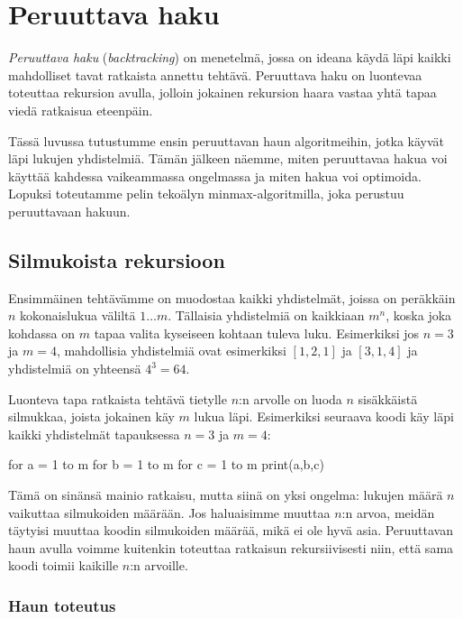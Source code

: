 \chapter{Peruuttava haku}

\emph{Peruuttava haku} (\emph{backtracking}) on menetelmä,
jossa on ideana käydä läpi kaikki mahdolliset tavat 
ratkaista annettu tehtävä.
Peruuttava haku on luontevaa toteuttaa rekursion avulla,
jolloin jokainen rekursion haara vastaa yhtä tapaa
viedä ratkaisua eteenpäin.

Tässä luvussa tutustumme ensin peruuttavan haun algoritmeihin,
jotka käyvät läpi lukujen yhdistelmiä.
Tämän jälkeen näemme, miten peruuttavaa hakua voi käyttää
kahdessa vaikeammassa ongelmassa ja miten hakua voi optimoida.
Lopuksi toteutamme pelin tekoälyn minmax-algoritmilla,
joka perustuu peruuttavaan hakuun.

\section{Silmukoista rekursioon}

Ensimmäinen tehtävämme on muodostaa kaikki yhdistelmät,
joissa on peräk\-käin $n$ kokonaislukua väliltä $1 \dots m$.
Tällaisia yhdistelmiä on kaikkiaan $m^n$,
koska joka kohdassa on $m$ tapaa valita kyseiseen kohtaan tuleva luku.
Esimerkiksi jos $n=3$ ja $m=4$, mahdollisia yhdistelmiä
ovat esimerkiksi $[1,2,1]$ ja $[3,1,4]$
ja yhdistelmiä on yhteensä $4^3=64$.

Luonteva tapa ratkaista tehtävä tietylle $n$:n arvolle on
luoda $n$ sisäkkäistä silmukkaa, joista jokainen käy $m$ lukua läpi.
Esimerkiksi seuraava koodi käy läpi kaikki yhdistelmät
tapauksessa $n=3$ ja $m=4$:

\begin{code}
for a = 1 to m
    for b = 1 to m
        for c = 1 to m
            print(a,b,c)
\end{code}

Tämä on sinänsä mainio ratkaisu, mutta siinä on yksi ongelma:
lukujen määrä $n$ vaikuttaa silmukoiden määrään.
Jos haluaisimme muuttaa $n$:n arvoa, meidän täytyisi muuttaa
koodin silmukoiden määrää, mikä ei ole hyvä asia.
Peruuttavan haun avulla voimme kuitenkin toteuttaa ratkaisun
rekursiivisesti niin, että sama koodi toimii kaikille $n$:n arvoille.

\subsection{Haun toteutus}

